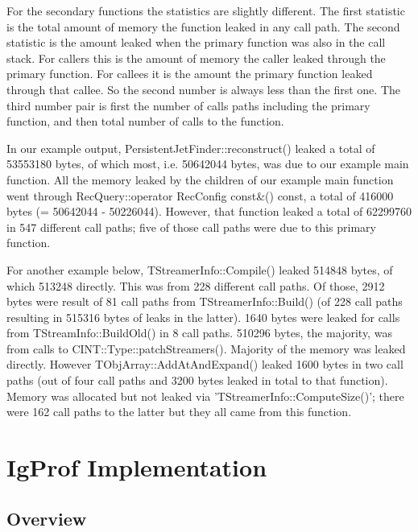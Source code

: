 \documentclass[10pt,a4paper,twocolumn]{article}
\begin{document}
For the secondary functions the statistics are slightly different. The
first statistic is the total amount of memory the function leaked in
any call path. The second statistic is the amount leaked when the
primary function was also in the call stack. For callers this is the
amount of memory the caller leaked through the primary function. For
callees it is the amount the primary function leaked through that
callee. So the second number is always less than the first one. The
third number pair is first the number of calls paths including the
primary function, and then total number of calls to the function.

In our example output, PersistentJetFinder::reconstruct() leaked a
total of 53553180 bytes, of which most, i.e. 50642044 bytes, was due
to our example main function. All the memory leaked by the children of
our example main function went through RecQuery::operator RecConfig
const\&() const, a total of 416000 bytes (= 50642044 -
50226044). However, that function leaked a total of 62299760 in 547
different call paths; five of those call paths were due to this
primary function.

For another example below, TStreamerInfo::Compile() leaked 514848
bytes, of which 513248 directly. This was from 228 different call
paths. Of those, 2912 bytes were result of 81 call paths from
TStreamerInfo::Build() (of 228 call paths resulting in 515316 bytes of
leaks in the latter). 1640 bytes were leaked for calls from
TStreamInfo::BuildOld() in 8 call paths. 510296 bytes, the majority,
was from calls to CINT::Type::patchStreamers(). Majority of the memory
was leaked directly. However TObjArray::AddAtAndExpand() leaked 1600
bytes in two call paths (out of four call paths and 3200 bytes leaked
in total to that function). Memory was allocated but not leaked via
'TStreamerInfo::ComputeSize()'; there were 162 call paths to the
latter but they all came from this function.

\section{IgProf Implementation}
\subsection{Overview}
\end{document}
